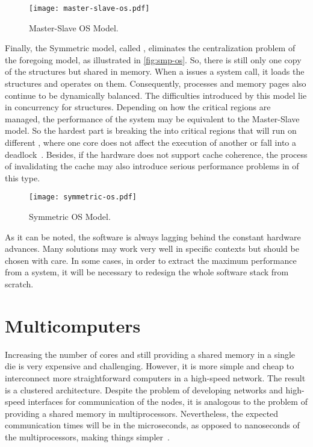 			\begin{figure}[!tb]
				\centering%
				\caption{Master-Slave OS Model.}%
				\label{fig:master-slave-os}%
				\texttt{[image: master-slave-os.pdf]}%
			\end{figure}

			Finally, the Symmetric model, called \smp, eliminates the centralization
			problem of the foregoing model, as illustrated in \autoref{fig:smp-os}.
			So, there is still only one copy of the \os structures but shared in memory.
			When a \cpu issues a system call, it loads the structures and operates on them.
			Consequently, processes and memory pages also continue to be dynamically balanced.
			The difficulties introduced by this model lie in concurrency for \os structures.
			Depending on how the critical regions are managed, the performance of the system
			may be equivalent to the Master-Slave model. So the hardest part is breaking the
			\os into critical regions that will run on different \cpus, where one core does
			not affect the execution of another or fall into a deadlock~\cite{tanenbaum:4ed}.
			Besides, if the hardware does not support cache coherence, the process of
			invalidating the cache may also introduce serious performance problems in \oss of this type.

			\begin{figure}[!tb]
				\centering%
				\caption{Symmetric OS Model.}%
				\label{fig:smp-os}%
				\texttt{[image: symmetric-os.pdf]}%
			\end{figure}

			As it can be noted, the software is always lagging behind the constant hardware advances.
			Many solutions may work very well in specific contexts but should be chosen with care.
			In some cases, in order to extract the maximum performance from a system, it will be
			necessary to redesign the whole software stack from scratch.

	\section{Multicomputers}
	\label{sec.multicomputers}

		Increasing the number of cores and still providing a shared memory in a
		single die is very expensive and challenging.
		However, it is more simple and cheap to interconnect more straightforward
		computers in a high-speed network. The result is a clustered architecture.
		Despite the problem of developing networks and high-speed interfaces
		for communication of the nodes, it is analogous to the problem of
		providing a shared memory in multiprocessors.
		Nevertheless, the expected communication times will be in the
		microseconds, as opposed to nanoseconds of the multiprocessors,
		making things simpler~\cite{tanenbaum:4ed}.

